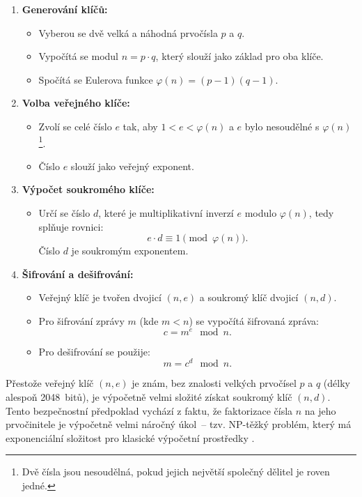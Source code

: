 \begin{enumerate}
  \item \textbf{Generování klíčů:}
    \begin{itemize}
      \item Vyberou se dvě velká a náhodná prvočísla \( p \) a \( q \).
      \item Vypočítá se modul \( n = p \cdot q \), který slouží jako základ pro oba klíče.
      \item Spočítá se Eulerova funkce \(\varphi(n) = (p-1)(q-1)\).
    \end{itemize}

  \item \textbf{Volba veřejného klíče:}
    \begin{itemize}
      \item Zvolí se celé číslo \( e \) tak, aby \( 1 < e < \varphi(n) \) a \( e \) bylo nesoudělné s \(\varphi(n)\)\footnote{Dvě čísla jsou nesoudělná, pokud jejich největší společný dělitel je roven jedné.}.
      \item Číslo \( e \) slouží jako veřejný exponent.
    \end{itemize}
  
  \item \textbf{Výpočet soukromého klíče:}
    \begin{itemize}
      \item Určí se číslo \( d \), které je multiplikativní inverzí \( e \) modulo \(\varphi(n)\), tedy splňuje rovnici:
      \[
      e \cdot d \equiv 1 \pmod{\varphi(n)}.
      \]
      Číslo \( d \) je soukromým exponentem.
    \end{itemize}
  
  \item \textbf{Šifrování a dešifrování:}
    \begin{itemize}
      \item Veřejný klíč je tvořen dvojicí \((n, e)\) a soukromý klíč dvojicí \((n, d)\).
      \item Pro šifrování zprávy \( m \) (kde \( m < n \)) se vypočítá šifrovaná zpráva:
      \[
      c = m^e \mod n.
      \]
      \item Pro dešifrování se použije:
      \[
      m = c^d \mod n.
      \]
    \end{itemize}
\end{enumerate}

Přestože veřejný klíč \((n, e)\) je znám, bez znalosti velkých prvočísel \( p \) a \( q \) (délky alespoň 2048~bitů), je výpočetně velmi složité získat soukromý klíč \((n, d)\). Tento bezpečnostní předpoklad vychází z faktu, že faktorizace čísla \( n \) na jeho prvočinitele je výpočetně velmi náročný úkol~-- tzv. NP-těžký problém, který má exponenciální složitost pro klasické výpočetní prostředky \parencite{tesar2021}.  

